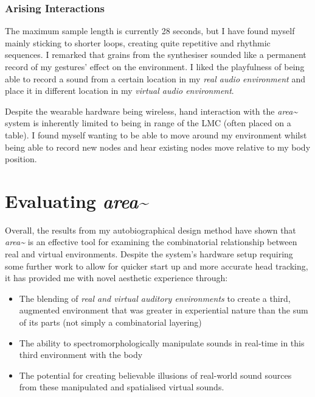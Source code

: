 \subsubsection{Arising Interactions}            \label{sec: area-study-results-arisingints}
The maximum sample length is currently 28 seconds, but I have found myself mainly sticking to shorter loops, creating quite repetitive and rhythmic sequences. I remarked that grains from the synthesiser sounded like a permanent record of my gestures’ effect on the environment. I liked the playfulness of being able to record a sound from a certain location in my \textit{real audio environment} and place it in different location in my \textit{virtual audio environment}.

Despite the wearable hardware being wireless, hand interaction with the \textit{area\textasciitilde{}} system is inherently limited to being in range of the LMC (often placed on a table). I found myself wanting to be able to move around my environment whilst being able to record new nodes and hear existing nodes move relative to my body position.
\section{Evaluating \textit{area\textasciitilde{}}} \label{sec: area-discussion-aar}
Overall, the results from my autobiographical design method have shown that \textit{area\textasciitilde{}} is an effective tool for examining the combinatorial relationship between real and virtual environments. Despite the system’s hardware setup requiring some further work to allow for quicker start up and more accurate head tracking, it has provided me with novel aesthetic experience through:
\begin{itemize}
    \item The blending of \textit{real and virtual auditory environments} to create a third, augmented environment that was greater in experiential nature than the sum of its parts (not simply a combinatorial layering)
    \item The ability to spectromorphologically manipulate sounds in real-time in this third environment with the body
    \item The potential for creating believable illusions of real-world sound sources from these manipulated and spatialised virtual sounds.
\end{itemize}

